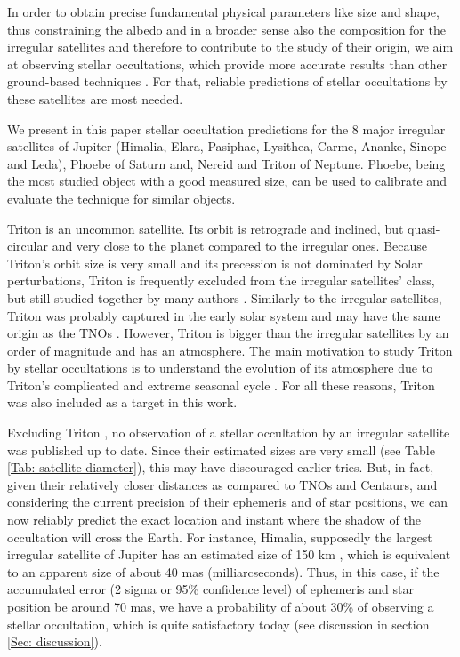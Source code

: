 In order to obtain precise fundamental physical parameters like size and shape, thus constraining the albedo and in a broader sense also the composition for the irregular satellites and therefore to contribute to the study of their origin, we aim at observing stellar occultations, which provide  more accurate results than other ground-based techniques \citep{Sicardy2011, Ortiz2012, Braga-Ribas2014}. For that, reliable predictions of stellar occultations by these satellites are most needed.

We present in this paper stellar occultation predictions for the 8 major irregular satellites of Jupiter (Himalia, Elara, Pasiphae, Lysithea, Carme, Ananke, Sinope and Leda), Phoebe of Saturn and, Nereid and Triton of Neptune. Phoebe, being the most studied object with a good measured size, can be used to calibrate and evaluate the technique for similar objects.

Triton is an uncommon satellite. Its orbit is retrograde and inclined, but quasi-circular and very close to the planet compared to the irregular ones. Because Triton's orbit size is very small and its precession is not dominated by Solar perturbations, Triton is frequently excluded from the irregular satellites' class, but still studied together by many authors \citep{Sheppard2005, Jewitt2007}. Similarly to the irregular satellites, Triton was probably captured in the early solar system and may have the same origin as the TNOs \citep{Agnor2006}. However, Triton is bigger than the irregular satellites by an order of magnitude and has an atmosphere. The main motivation to study Triton by stellar occultations is to understand the evolution of its atmosphere due to Triton's complicated and extreme seasonal cycle \citep{McKinnon2007, Elliot_2000}. For all these reasons, Triton was also included as a target in this work.

Excluding Triton \citep{Olkin1997, Elliot_2000}, no observation of a stellar occultation by an irregular satellite was published up to date. Since their estimated sizes are very small (see Table \ref{Tab: satellite-diameter}), this may have discouraged earlier tries. But, in fact, given their relatively closer distances as compared to TNOs and Centaurs, and considering the current precision of their ephemeris and of star positions, we can now reliably predict the exact location and instant where the shadow of the occultation will cross the Earth. For instance, Himalia, supposedly the largest irregular satellite of Jupiter has an estimated size of 150 km \citep{Porco2003}, which is equivalent to an apparent size of about 40 mas (milliarcseconds). Thus, in this case, if the accumulated error (2 sigma or 95\% confidence level) of ephemeris and star position be around 70 mas, we have a probability of about 30\% of observing a stellar occultation, which is quite satisfactory today (see discussion in section \ref{Sec: discussion}).

